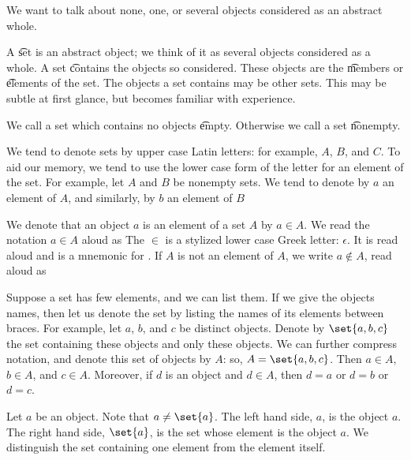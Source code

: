 

We want to talk about none, one, or several objects considered as an abstract whole.


A \t{set} is an abstract object; we think of it as several objects considered as a whole.
A set \t{contains} the objects so considered.
These objects are the \t{members} or \t{elements} of the set.
The objects a set contains may be other sets.
This may be subtle at first glance, but becomes familiar with experience.

We call a set which contains no objects \t{empty}.
Otherwise we call a set \t{nonempty}.



We tend to denote sets by upper case Latin letters: for example, $A$, $B$, and $C$.
To aid our memory, we tend to use the lower case form of the letter for an element of the set.
For example, let $A$ and $B$ be nonempty sets.
We tend to denote by $a$ an element of $A$, and similarly, by $b$ an element of $B$

We denote that an object $a$ is an element of a set $A$ by $a \in A$.
We read the notation $a \in A$ aloud as 
The $\in$ is a stylized lower case Greek letter: $\epsilon$.
It is read aloud  and is a mnemonic for .
If $A$ is not an element of $A$, we write $a \not\in A$, read aloud as 

Suppose a set has few elements, and we can list them.
If we give the objects names, then let us denote the set by listing the names of its elements between braces.
For example, let $a$, $b$, and $c$ be distinct objects.
Denote by $\set{a, b, c}$ the set containing these objects and only these objects.
We can further compress notation, and denote this set of objects by $A$: so, $A = \set{a, b, c}$.
Then $a \in A$, $b \in A$, and $c \in A$.
Moreover, if $d$ is an object and $d \in A$, then $d = a$ or $d = b$ or $d = c$.

Let $a$ be an object.
Note that $a \neq \set{a}$.
The left hand side, $a$, is the object $a$.
The right hand side, $\set{a}$, is the set whose element is the object $a$.
We distinguish the set containing one element from the element itself.


